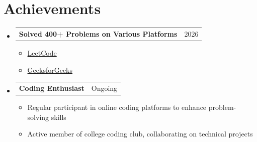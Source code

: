 \documentclass[letterpaper,11pt]{article}
\makeatletter
\newcommand{\resumeItem}[1]{
  \item\small{
    {#1 \vspace{-2pt}}
  }
}
\newcommand{\resumeProjectHeading}[2]{
    \item
    \begin{tabular*}{0.97\textwidth}{l@{\extracolsep{\fill}}r}
      \small#1 & #2 \\
    \end{tabular*}\vspace{-7pt}
}
\newcommand{\resumeSubHeadingListStart}{\begin{itemize}[leftmargin=0.15in, label={}]}
\newcommand{\resumeSubHeadingListEnd}{\end{itemize}}
\newcommand{\resumeItemListStart}{\begin{itemize}}
\newcommand{\resumeItemListEnd}{\end{itemize}\vspace{-5pt}}
\makeatother
\begin{document}
\section{Achievements}
    \resumeSubHeadingListStart
      \resumeProjectHeading
          {\textbf{Solved 400+ Problems on Various Platforms}}{2026}
          \resumeItemListStart
            \resumeItem{\href{https://leetcode.com/u/anup_sawant12/}{LeetCode}}
            \resumeItem{\href{https://www.geeksforgeeks.org/profile/anupsaway9kp}{GeeksforGeeks}}
          \resumeItemListEnd
      \resumeProjectHeading
          {\textbf{Coding Enthusiast}}{Ongoing}
          \resumeItemListStart
            \resumeItem{Regular participant in online coding platforms to enhance problem-solving skills}
            \resumeItem{Active member of college coding club, collaborating on technical projects}
          \resumeItemListEnd
    \resumeSubHeadingListEnd
\end{document}
